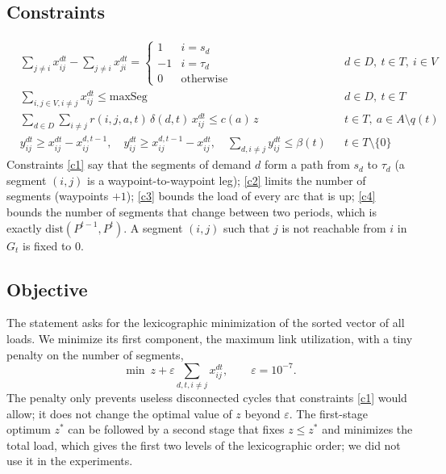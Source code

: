 \documentclass[11pt,a4paper]{article}
\begin{document}
\subsection{Constraints}
\begin{align}
&\sum_{j\ne i} x^{dt}_{ij}-\sum_{j\ne i} x^{dt}_{ji}=\begin{cases}1 & i=s_d\\ -1 & i=\tau_d\\ 0&\text{otherwise}\end{cases} && d\in D,\ t\in T,\ i\in V \label{c1}\\
&\sum_{i,j\in V, i\neq j} x^{dt}_{ij}\le \mathrm{maxSeg} && d\in D,\ t\in T \label{c2}\\
&\sum_{d\in D}\sum_{i\ne j} r(i,j,a,t)\,\delta(d,t)\,x^{dt}_{ij}\le c(a)\,z && t\in T,\ a\in A\setminus q(t) \label{c3}\\
&y^{dt}_{ij}\ge x^{dt}_{ij}-x^{d,t-1}_{ij},\quad y^{dt}_{ij}\ge x^{d,t-1}_{ij}-x^{dt}_{ij},\quad \sum_{d,i\ne j} y^{dt}_{ij}\le \beta(t) && t\in T\setminus\{0\} \label{c4}
\end{align}
Constraints \eqref{c1} say that the segments of demand $d$ form a path from $s_d$ to $\tau_d$ (a segment $(i,j)$ is a waypoint-to-waypoint leg); \eqref{c2} limits the number of segments (waypoints $+1$); \eqref{c3} bounds the load of every arc that is up; \eqref{c4} bounds the number of segments that change between two periods, which is exactly $\mathrm{dist}(P^{t-1},P^t)$. A segment $(i,j)$ such that $j$ is not reachable from $i$ in $G_t$ is fixed to $0$.

\subsection{Objective}
The statement asks for the lexicographic minimization of the sorted vector of all loads. We minimize its first component, the maximum link utilization, with a tiny penalty on the number of segments,
\begin{equation}
\min\ z+\varepsilon\sum_{d,t,i\ne j}x^{dt}_{ij},\qquad \varepsilon=10^{-7}. \label{obj}
\end{equation}
The penalty only prevents useless disconnected cycles that constraints \eqref{c1} would allow; it does not change the optimal value of $z$ beyond $\varepsilon$. The first-stage optimum $z^*$ can be followed by a second stage that fixes $z\le z^*$ and minimizes the total load, which gives the first two levels of the lexicographic order; we did not use it in the experiments.
\end{document}
